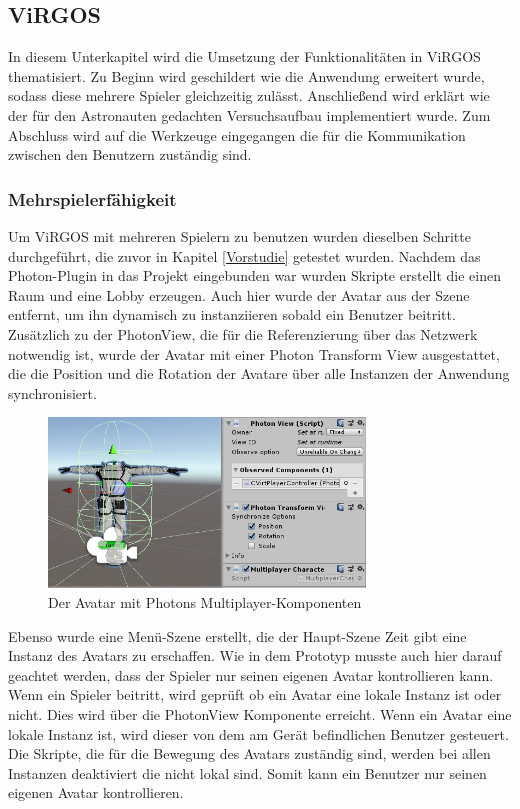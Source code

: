 \subsection{ViRGOS}
In diesem Unterkapitel wird die Umsetzung der Funktionalitäten in ViRGOS thematisiert. Zu Beginn wird geschildert wie die Anwendung erweitert wurde, sodass diese mehrere Spieler gleichzeitig zulässt. Anschließend wird erklärt wie der für den Astronauten gedachten Versuchsaufbau implementiert wurde. Zum Abschluss wird auf die Werkzeuge eingegangen die für die Kommunikation zwischen den Benutzern zuständig sind. 

\subsubsection{Mehrspielerfähigkeit}
Um ViRGOS mit mehreren Spielern zu benutzen wurden dieselben Schritte durchgeführt, die zuvor in Kapitel \ref{Vorstudie} getestet wurden. Nachdem das Photon-Plugin in das Projekt eingebunden war wurden Skripte erstellt die einen Raum und eine Lobby erzeugen. Auch hier wurde der Avatar aus der Szene entfernt, um ihn dynamisch zu instanziieren sobald ein Benutzer beitritt. Zusätzlich zu der PhotonView, die für die Referenzierung über das Netzwerk notwendig ist, wurde der Avatar mit einer Photon Transform View ausgestattet, die die Position und die Rotation der Avatare über alle Instanzen der Anwendung synchronisiert.

\begin{figure}[H]
\centering
\includegraphics[width=0.75\textwidth]{UnityComponents.PNG}
\caption{Der Avatar mit Photons Multiplayer-Komponenten}
\end{figure}

Ebenso wurde eine Menü-Szene erstellt, die der Haupt-Szene Zeit gibt eine Instanz des Avatars zu erschaffen. Wie in dem Prototyp musste auch hier darauf geachtet werden, dass der Spieler nur seinen eigenen Avatar kontrollieren kann. Wenn ein Spieler beitritt, wird geprüft ob ein Avatar eine lokale Instanz ist oder nicht. Dies wird über die PhotonView Komponente erreicht. Wenn ein Avatar eine lokale Instanz ist, wird dieser von dem am Gerät befindlichen Benutzer gesteuert. Die Skripte, die für die Bewegung des Avatars zuständig sind, werden bei allen Instanzen deaktiviert die nicht lokal sind. Somit kann ein Benutzer nur seinen eigenen Avatar kontrollieren.\\

